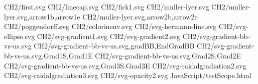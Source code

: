 CH2/first.svg
CH2/linecap.svg
CH2/fick1.svg
CH2/muller-lyer.svg
CH2/muller-lyer.svg,arrow1b,arrow1e
CH2/muller-lyer.svg,arrow2b,arrow2e
CH2/poggendorff.svg
CH2/colorinenv.svg
CH2/svg-hermann-line.svg
CH2/svg-ellipse.svg
CH2/svg-gradient1.svg
CH2/svg-gradient2.svg
CH2/svg-gradient-bb-vs-us.svg
CH2/svg-gradient-bb-vs-us.svg,gradBB,EndGradBB
CH2/svg-gradient-bb-vs-us.svg,Grad1S,Grad1E
CH2/svg-gradient-bb-vs-us.svg,Grad2S,Grad2E
CH2/svg-gradient-bb-vs-us.svg,Grad3S,Grad3E
CH2/svg-raidalgradiation2.svg
CH2/svg-raidalgradiation3.svg
CH2/svg-opacity2.svg
JavaScript/testScope.html
